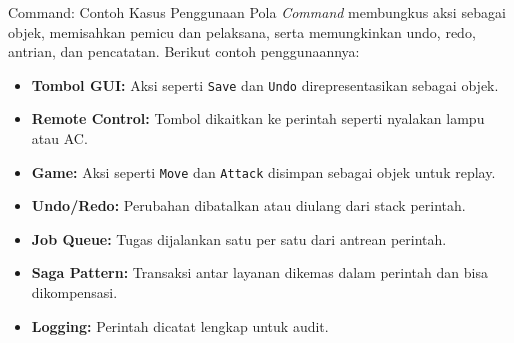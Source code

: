 \documentclass[aspectratio=169, table]{beamer}
\begin{document}
\begin{frame}{Command: Contoh Kasus Penggunaan}
	\vspace{20pt}
	Pola \textit{Command} membungkus aksi sebagai objek, memisahkan pemicu dan pelaksana, serta memungkinkan undo, redo, antrian, dan pencatatan. Berikut contoh penggunaannya:
	
	\vspace{6pt}
	\begin{itemize}
		\item \textbf{Tombol GUI:} Aksi seperti \texttt{Save} dan \texttt{Undo} direpresentasikan sebagai objek.
		
		\item \textbf{Remote Control:} Tombol dikaitkan ke perintah seperti nyalakan lampu atau AC.
		
		\item \textbf{Game:} Aksi seperti \texttt{Move} dan \texttt{Attack} disimpan sebagai objek untuk replay.
		
		\item \textbf{Undo/Redo:} Perubahan dibatalkan atau diulang dari stack perintah.
		
		\item \textbf{Job Queue:} Tugas dijalankan satu per satu dari antrean perintah.
		
		\item \textbf{Saga Pattern:} Transaksi antar layanan dikemas dalam perintah dan bisa dikompensasi.
		
		\item \textbf{Logging:} Perintah dicatat lengkap untuk audit.
	\end{itemize}
\end{frame}
\end{document}
